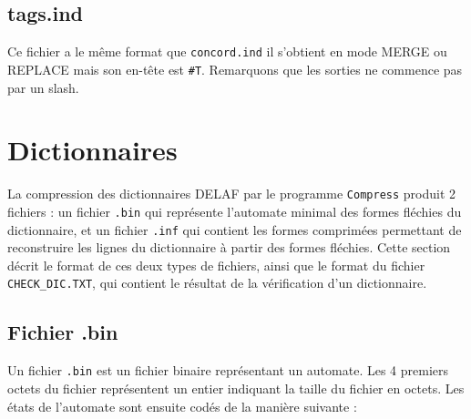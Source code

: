 \subsection{tags.ind}
\label{section-tags-ind}
Ce fichier a le même format que \verb+concord.ind+ il s'obtient en mode MERGE ou REPLACE mais son en-tête est \verb+#T+. Remarquons que les sorties ne commence pas par un slash.
 


\section{Dictionnaires}
La compression des dictionnaires DELAF par le programme \verb+Compress+ produit 2 fichiers : un
fichier \verb+.bin+  qui représente l’automate minimal des formes fléchies du dictionnaire, et un
fichier \verb+.inf+ qui contient les formes comprimées permettant de reconstruire les lignes du
dictionnaire à partir des formes fléchies. Cette section décrit le format de ces deux types de
fichiers, ainsi que le format du fichier \verb+CHECK_DIC.TXT+, qui contient le résultat de
la vérification d’un dictionnaire.



\subsection{Fichier .bin}
Un fichier \verb$.bin$ est un fichier binaire représentant un automate. Les 4 premiers octets du
fichier représentent un entier indiquant la taille du fichier en octets. Les états de l’automate
sont ensuite codés de la manière suivante :

